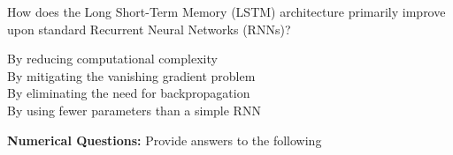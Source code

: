 \documentclass[12pt]{exam}
\begin{document}
\begin{questions}
                \question How does the Long Short-Term Memory (LSTM) architecture primarily improve upon standard Recurrent Neural Networks (RNNs)? \\
                \begin{oneparchoices}
                    \choice By reducing computational complexity \\
                    \choice By mitigating the vanishing gradient problem \\ %
                    \choice By eliminating the need for backpropagation \\
                    \choice By using fewer parameters than a simple RNN
                \end{oneparchoices}               
       
        \end{questions}
        \setcounter{question}{0}
        \begin{center}

            \textbf{Numerical Questions:} Provide answers to the following
        \end{center}
\end{document}
